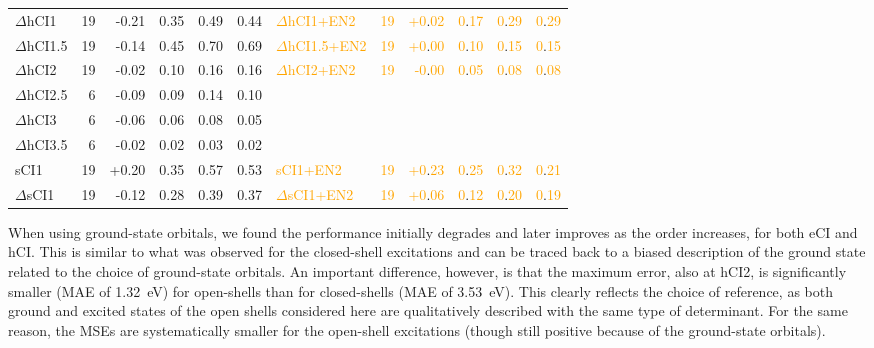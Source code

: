 \documentclass[aip,jcp,reprint,noshowkeys,superscriptaddress]{revtex4-1}
\newcommand{\fk}[1]{\textcolor{orange}{#1}}
\begin{document}
\begin{table}[ht!]
\begin{ruledtabular}
\begin{tabular}{ldddddlddddd}
%
\hline
$\Delta$hCI1      & 19 & -0.21 & 0.35 & 0.49 & 0.44  & \fk{$\Delta$hCI1+EN2}   & \fk{19} & \fk{+0}.\fk{02} & \fk{0}.\fk{17} & \fk{0}.\fk{29} & \fk{0}.\fk{29} \\
$\Delta$hCI1.5    & 19 & -0.14 & 0.45 & 0.70 & 0.69  & \fk{$\Delta$hCI1.5+EN2} & \fk{19} & \fk{+0}.\fk{00} & \fk{0}.\fk{10} & \fk{0}.\fk{15} & \fk{0}.\fk{15} \\
$\Delta$hCI2      & 19 & -0.02 & 0.10 & 0.16 & 0.16  & \fk{$\Delta$hCI2+EN2}   & \fk{19} & \fk{-0}.\fk{00} & \fk{0}.\fk{05} & \fk{0}.\fk{08} & \fk{0}.\fk{08} \\
$\Delta$hCI2.5    &  6 & -0.09 & 0.09 & 0.14 & 0.10  & & & & & & \\
$\Delta$hCI3      &  6 & -0.06 & 0.06 & 0.08 & 0.05  & & & & & & \\
$\Delta$hCI3.5    &  6 & -0.02 & 0.02 & 0.03 & 0.02  & & & & & & \\
%
\hline
sCI1              & 19 & +0.20 & 0.35 & 0.57 & 0.53  & \fk{sCI1+EN2}           & \fk{19} & \fk{+0}.\fk{23} & \fk{0}.\fk{25} & \fk{0}.\fk{32} & \fk{0}.\fk{21} \\
$\Delta$sCI1      & 19 & -0.12 & 0.28 & 0.39 & 0.37  & \fk{$\Delta$sCI1+EN2}   & \fk{19} & \fk{+0}.\fk{06} & \fk{0}.\fk{12} & \fk{0}.\fk{20} & \fk{0}.\fk{19} \\
\end{tabular}
\end{ruledtabular}
\end{table}

When using ground-state orbitals, we found the performance initially degrades and later improves as the order increases, for both eCI and hCI.
This is similar to what was observed for the closed-shell excitations
and can be traced back to a biased description of the ground state related to the choice of ground-state orbitals.
An important difference, however, is that the maximum error, also at hCI2, is significantly smaller (MAE of \SI{1.32}{\eV}) for open-shells
than for closed-shells (MAE of \SI{3.53}{\eV}).
This clearly reflects the choice of reference, as both ground and excited states of the open shells considered here are qualitatively described with the same type of determinant.
For the same reason, the MSEs are systematically smaller for the open-shell excitations (though still positive because of the ground-state orbitals).
\end{document}
